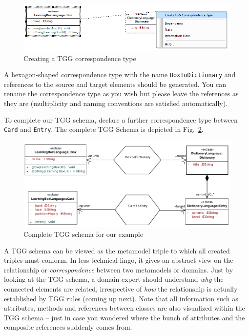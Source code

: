 \begin{figure}[htbp]
\begin{center}
  \includegraphics[width=\textwidth]{pics/tggBilder/tggSchema/tgg5}
  \caption{Creating a TGG correspondence type} 
  \label{fig:create_correspondence}
\end{center}
\end{figure}

A hexagon-shaped correspondence type with the name \texttt{BoxToDiction\-ary} and references to the source and target elements should be generated.
You can rename the correspondence type as you wish but please leave the references as they are (multiplicity and naming conventions are satisfied automatically).

To complete our TGG schema, declare a further correspondence type between \texttt{Card} and \texttt{Entry}.
The complete TGG Schema is depicted in Fig.~\ref{fig:complete_tgg_schema}.

\begin{figure}[htbp]
\begin{center}
  \includegraphics[width=\textwidth]{pics/tggBilder/tggSchema/tgg7}
  \caption{Complete TGG schema for our example}
  \label{fig:complete_tgg_schema}
\end{center}
\end{figure}

A TGG schema can be viewed as the metamodel triple to which all created triples must conform.
In less technical lingo, it gives an abstract view on the relationship or \emph{correspondence} between two metamodels or domains.
Just by looking at the TGG schema, a domain expert should understand \emph{why} the connected elements are related, irrespective of \emph{how} the relationship is actually established by TGG rules (coming up next).
Note that all information such as attributes, methods and references between classes are also visualized within the TGG schema -- just in case you wondered where the bunch of attributes and the composite references suddenly comes from.